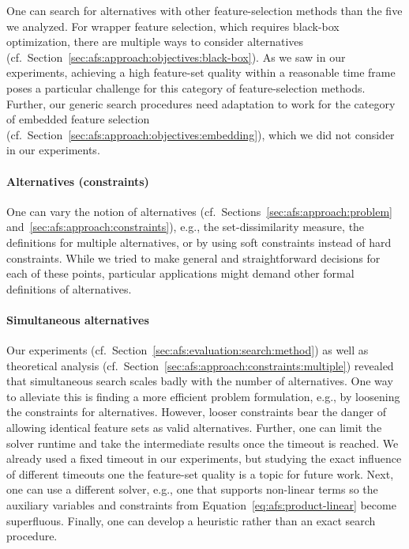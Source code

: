 \documentclass{article}
\theoremstyle{definition}
\begin{document}
One can search for alternatives with other feature-selection methods than the five we analyzed.
For wrapper feature selection, which requires black-box optimization, there are multiple ways to consider alternatives (cf.~Section~\ref{sec:afs:approach:objectives:black-box}).
As we saw in our experiments, achieving a high feature-set quality within a reasonable time frame poses a particular challenge for this category of feature-selection methods.
Further, our generic search procedures need adaptation to work for the category of embedded feature selection (cf.~Section~\ref{sec:afs:approach:objectives:embedding}), which we did not consider in our experiments.

\paragraph{Alternatives (constraints)}

One can vary the notion of alternatives (cf.~Sections~\ref{sec:afs:approach:problem} and~\ref{sec:afs:approach:constraints}), e.g., the set-dissimilarity measure, the definitions for multiple alternatives, or by using soft constraints instead of hard constraints.
While we tried to make general and straightforward decisions for each of these points, particular applications might demand other formal definitions of alternatives.

\paragraph{Simultaneous alternatives}

Our experiments (cf.~Section~\ref{sec:afs:evaluation:search:method}) as well as theoretical analysis (cf.~Section~\ref{sec:afs:approach:constraints:multiple}) revealed that simultaneous search scales badly with the number of alternatives.
One way to alleviate this is finding a more efficient problem formulation, e.g., by loosening the constraints for alternatives.
However, looser constraints bear the danger of allowing identical feature sets as valid alternatives.
Further, one can limit the solver runtime and take the intermediate results once the timeout is reached.
We already used a fixed timeout in our experiments, but studying the exact influence of different timeouts one the feature-set quality is a topic for future work.
Next, one can use a different solver, e.g., one that supports non-linear terms so the auxiliary variables and constraints from Equation~\ref{eq:afs:product-linear} become superfluous.
Finally, one can develop a heuristic rather than an exact search procedure.
\end{document}
